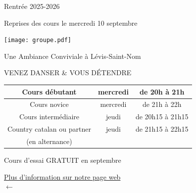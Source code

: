 \documentclass[12pt,a4paper]{article}
\newcommand{\logo}{\makebox[56mm][c]{\rule{0mm}{66mm}\raisebox{12mm}{\texttt{[image: ~/aldc-4couleurs-3.pdf]}}}}
\begin{document}

\vspace*{-20mm}\hspace*{-15mm}



\begin{center}

\bfseries
\color{orange!75!black}

\LARGE

Rentrée 2025-2026

 Reprises des cours le mercredi 10 septembre

\vfill

\texttt{[image: groupe.pdf]}

\color{green!50!black}%
Une Ambiance Conviviale à Lévis-Saint-Nom

\color{blue!50!black}%
VENEZ DANSER \& VOUS DÉTENDRE

\vfill

\large
\setlength\arrayrulewidth{2pt}
\color{brown!50!black}
\begin{tabular}{|c|c|c|}
  \hline
  \rowcolor{orange!10}
  Cours débutant & mercredi & de 20h à 21h \\
  \hline
  \rowcolor{orange!20}
  Cours novice & mercredi & de 21h à 22h \\
  \hline
  \rowcolor{orange!30}
  Cours intermédiaire & jeudi & de 20h15 à 21h15 \\
  \hline
  \rowcolor{green!20}%
  \color{green!25!black}%
  Country catalan ou partner & jeudi & de 21h15 à 22h15 \\
  \rowcolor{green!20}%
  \color{green!25!black}%
  (en alternance) &  &  \\
  \hline
\end{tabular}
\vfill

\Large

\color{red!70!black}%
Cours d'essai GRATUIT en septembre

\vfill

\href{https://alevisdanse.github.io}{}
\qquad
\begin{minipage}[c]{0.45\textwidth}
  \Huge\color{black!50!blue}  \href{https://alevisdanse.github.io}{Plus d'information sur notre page web \\
    $\longleftarrow$}
\end{minipage}

\end{center}
\end{document}
